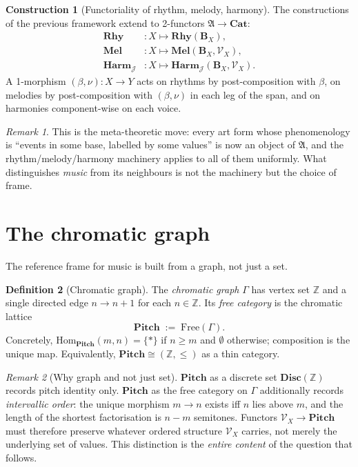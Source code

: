 \documentclass[11pt]{article}
\theoremstyle{definition}
\newtheorem{definition}{Definition}[section]
\newtheorem{construction}[definition]{Construction}
\theoremstyle{plain}
\theoremstyle{remark}
\newtheorem*{remark}{Remark}
\newcommand{\Cat}{\mathbf{Cat}}
\newcommand{\B}{\mathbf{B}}
\newcommand{\V}{\mathcal{V}}
\newcommand{\J}{\mathcal{J}}
\newcommand{\Rhy}{\mathbf{Rhy}}
\newcommand{\Mel}{\mathbf{Mel}}
\newcommand{\Harm}{\mathbf{Harm}}
\newcommand{\Pitch}{\mathbf{Pitch}}
\newcommand{\Disc}{\mathbf{Disc}}
\newcommand{\Frame}{\mathfrak{A}}
\newcommand{\Z}{\mathbb{Z}}
\begin{document}
\begin{construction}[Functoriality of rhythm, melody, harmony]
The constructions of the previous framework extend to 2-functors
$\Frame \to \Cat$:
\begin{align*}
\Rhy   &: X \mapsto \Rhy(\B_X), \\
\Mel   &: X \mapsto \Mel(\B_X, \V_X), \\
\Harm_\J &: X \mapsto \Harm_\J(\B_X, \V_X).
\end{align*}
A 1-morphism $(\beta, \nu) : X \to Y$ acts on rhythms by
post-composition with $\beta$, on melodies by post-composition with
$(\beta, \nu)$ in each leg of the span, and on harmonies
component-wise on each voice.
\end{construction}

\begin{remark}
This is the meta-theoretic move: every art form whose phenomenology
is ``events in some base, labelled by some values'' is now an object
of $\Frame$, and the rhythm/melody/harmony machinery applies to all
of them uniformly. What distinguishes \emph{music} from its
neighbours is not the machinery but the choice of frame.
\end{remark}

\section{The chromatic graph}

The reference frame for music is built from a graph, not just a set.

\begin{definition}[Chromatic graph]\label{def:chromatic}
The \emph{chromatic graph} $\Gamma$ has vertex set $\Z$ and a single
directed edge $n \to n{+}1$ for each $n \in \Z$. Its \emph{free
category} is the chromatic lattice
\[
\Pitch \;:=\; \mathrm{Free}(\Gamma).
\]
Concretely, $\mathrm{Hom}_\Pitch(m, n) = \{*\}$ if $n \geq m$ and
$\emptyset$ otherwise; composition is the unique map. Equivalently,
$\Pitch \cong (\Z, \leq)$ as a thin category.
\end{definition}

\begin{remark}[Why graph and not just set]
$\Pitch$ as a discrete set $\Disc(\Z)$ records pitch identity only.
$\Pitch$ as the free category on $\Gamma$ additionally records
\emph{intervallic order}: the unique morphism $m \to n$ exists iff $n$
lies above $m$, and the length of the shortest factorisation is
$n - m$ semitones. Functors $\V_X \to \Pitch$ must therefore preserve
whatever ordered structure $\V_X$ carries, not merely the underlying
set of values. This distinction is the \emph{entire content} of the
question that follows.
\end{remark}
\end{document}
